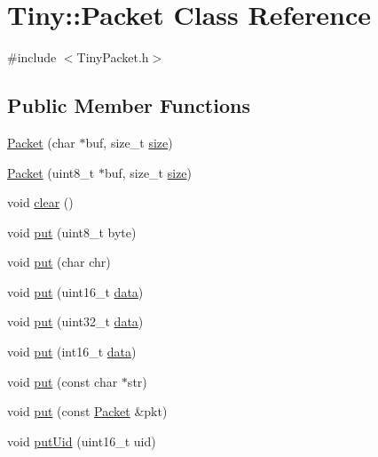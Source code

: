 \hypertarget{classTiny_1_1Packet}{}\section{Tiny\+:\+:Packet Class Reference}
\label{classTiny_1_1Packet}


{\ttfamily \#include $<$Tiny\+Packet.\+h$>$}

\subsection*{Public Member Functions}
\begin{DoxyCompactItemize}
\item 
\hyperlink{classTiny_1_1Packet_aad47b3053945b29b1b46d76b31b72960}{Packet} (char $\ast$buf, size\+\_\+t \hyperlink{classTiny_1_1Packet_a872f81d4ad35e49b232101c7c12e34f2}{size})
\item 
\hyperlink{classTiny_1_1Packet_ac542e1cd0bc08fea60f94ac1db1e1ff4}{Packet} (uint8\+\_\+t $\ast$buf, size\+\_\+t \hyperlink{classTiny_1_1Packet_a872f81d4ad35e49b232101c7c12e34f2}{size})
\item 
void \hyperlink{classTiny_1_1Packet_a9bfdb9244515ef3dbf1056c1e37d0902}{clear} ()
\item 
void \hyperlink{classTiny_1_1Packet_a52c746f604ee6c0e4e78902b4cf710a9}{put} (uint8\+\_\+t byte)
\item 
void \hyperlink{classTiny_1_1Packet_a6e1e5236908290f28c3b9a0818242b5b}{put} (char chr)
\item 
void \hyperlink{classTiny_1_1Packet_a0055b5d1c437104e38bf66ece8ab84ba}{put} (uint16\+\_\+t \hyperlink{classTiny_1_1Packet_a3307ba504caba9c5eee8f1f32cf1a749}{data})
\item 
void \hyperlink{classTiny_1_1Packet_aed30fc087142669b37ec99d9d6572e57}{put} (uint32\+\_\+t \hyperlink{classTiny_1_1Packet_a3307ba504caba9c5eee8f1f32cf1a749}{data})
\item 
void \hyperlink{classTiny_1_1Packet_a464ddc51642812e604ac39f775762165}{put} (int16\+\_\+t \hyperlink{classTiny_1_1Packet_a3307ba504caba9c5eee8f1f32cf1a749}{data})
\item 
void \hyperlink{classTiny_1_1Packet_a6b5880ebffa02df3a380a270809433e1}{put} (const char $\ast$str)
\item 
void \hyperlink{classTiny_1_1Packet_a5741e3aec04c9100ce00a6b702417231}{put} (const \hyperlink{classTiny_1_1Packet}{Packet} \&pkt)
\item 
void \hyperlink{classTiny_1_1Packet_ae8764bf70fd6f09df2cb15c02ce2aa30}{put\+Uid} (uint16\+\_\+t uid)

\end{DoxyCompactItemize}
